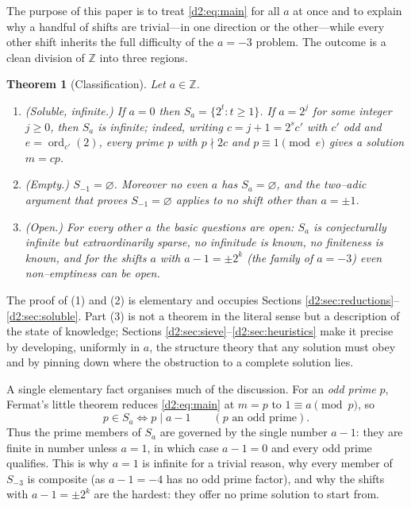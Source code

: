 \documentclass[a4paper]{article}
\theoremstyle{plain}
\newtheorem{theorem}{Theorem}[subsection]
\theoremstyle{definition}
\theoremstyle{remark}
\newcommand{\Z}{\mathbb{Z}}
\newcommand{\ord}{\operatorname{ord}}
\newcommand{\dvd}{\mid}
\newcommand{\Sa}{S_a}
\begin{document}
The purpose of this paper is to treat \eqref{d2:eq:main} for all $a$ at once and to explain why a handful of shifts are trivial---in one direction or the other---while every other shift inherits the full difficulty of the $a=-3$ problem. The outcome is a clean division of $\Z$ into three regions.

\begin{theorem}[Classification]\label{d2:thm:main}
Let $a\in\Z$.
\begin{enumerate}
\item\emph{(Soluble, infinite.)} If $a=0$ then $\Sa=\{2^{t}:t\ge1\}$. If $a=2^{j}$ for some integer $j\ge0$, then $\Sa$ is infinite; indeed, writing $c=j+1=2^{s}c'$ with $c'$ odd and $e=\ord_{c'}(2)$, every prime $p$ with $p\nmid 2c$ and $p\equiv1\pmod e$ gives a solution $m=cp$.
\item\emph{(Empty.)} $S_{-1}=\varnothing$. Moreover no even $a$ has $\Sa=\varnothing$, and the two--adic argument that proves $S_{-1}=\varnothing$ applies to no shift other than $a=\pm1$.
\item\emph{(Open.)} For every other $a$ the basic questions are open: $\Sa$ is conjecturally infinite but extraordinarily sparse, no infinitude is known, no finiteness is known, and for the shifts $a$ with
 $a-1=\pm2^{k}$ (the family of $a=-3$) even non--emptiness can be open.
\end{enumerate}
\end{theorem}

The proof of (1) and (2) is elementary and occupies Sections \ref{d2:sec:reductions}--\ref{d2:sec:soluble}. Part (3) is not a theorem in the literal sense but a description of the state of knowledge; Sections \ref{d2:sec:sieve}--\ref{d2:sec:heuristics} make it precise by developing, uniformly in $a$, the structure theory that any solution must obey and by pinning down where the obstruction to a complete solution lies.

A single elementary fact organises much of the discussion. For an \emph{odd prime} $p$, Fermat's little theorem reduces \eqref{d2:eq:main} at $m=p$ to $1\equiv a\pmod p$, so
\begin{equation}\label{d2:eq:primes}
p\in\Sa\iff p\dvd a-1\qquad(p\text{ an odd prime}).
\end{equation}
Thus the prime members of $\Sa$ are governed by the single number $a-1$: they are finite in number unless $a=1$, in which case $a-1=0$ and every odd prime qualifies. This is why $a=1$ is infinite for a trivial reason, why every member of $S_{-3}$ is composite (as $a-1=-4$ has no odd prime factor), and why the shifts with $a-1=\pm2^{k}$ are the hardest: they offer no prime solution to start from.
\end{document}
